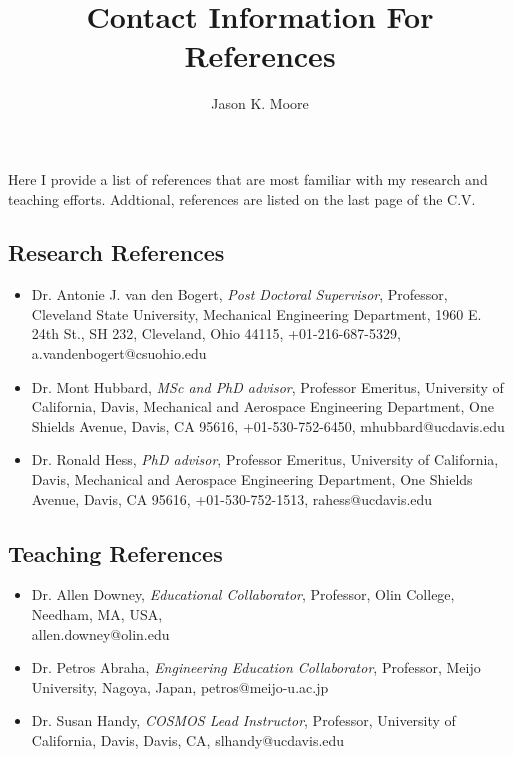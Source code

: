 \documentclass{article}
\title{Contact Information For References}
\author{Jason K. Moore}
\date{}
\begin{document}
\maketitle

Here I provide a list of references that are most familiar with my research and
teaching efforts. Addtional, references are listed on the last page of the C.V.

\subsection*{Research References}

\begin{itemize}
  \item Dr. Antonie J. van den Bogert,
    \emph{Post Doctoral Supervisor},
    Professor,
    Cleveland State University,
    Mechanical Engineering Department,
    1960 E. 24th St., SH 232,
    Cleveland, Ohio 44115,
    +01-216-687-5329,
    a.vandenbogert@csuohio.edu
  \item Dr. Mont Hubbard,
    \emph{MSc and PhD advisor},
    Professor Emeritus,
    University of California, Davis,
    Mechanical and Aerospace Engineering Department,
    One Shields Avenue, Davis, CA 95616,
    +01-530-752-6450,
    mhubbard@ucdavis.edu
  \item Dr. Ronald Hess,
    \emph{PhD advisor},
    Professor Emeritus,
    University of California, Davis,
    Mechanical and Aerospace Engineering Department,
    One Shields Avenue, Davis, CA 95616,
    +01-530-752-1513,
    rahess@ucdavis.edu
\end{itemize}

\subsection*{Teaching References}

\begin{itemize}
  \item Dr. Allen Downey,
    \emph{Educational Collaborator},
    Professor,
    Olin College,
    Needham, MA, USA,
    \\ allen.downey@olin.edu
  \item Dr. Petros Abraha,
    \emph{Engineering Education Collaborator},
    Professor,
    Meijo University,
    Nagoya, Japan,
    petros@meijo-u.ac.jp
  \item Dr. Susan Handy,
    \emph{COSMOS Lead Instructor},
    Professor,
    University of California, Davis,
    Davis, CA,
    slhandy@ucdavis.edu
\end{itemize}
\end{document}
